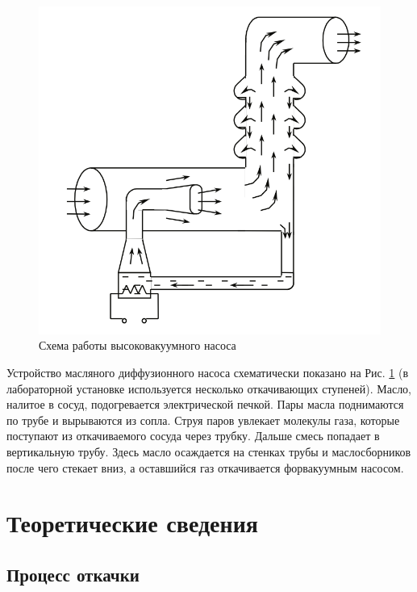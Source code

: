 \documentclass[a4paper,12pt]{article}
\theoremstyle{definition}
\begin{document}
	\begin{figure}
		\centering
		\includegraphics[width=1\linewidth]{pump}
		\caption{Схема работы высоковакуумного насоса}\label{pump}
	\end{figure}

	Устройство масляного диффузионного насоса схематически показано на Рис. \ref{pump} (в лабораторной установке используется несколько откачивающих ступеней). Масло, налитое в сосуд, подогревается электрической печкой. Пары масла поднимаются по трубе и вырываются из сопла. Струя паров увлекает молекулы газа, которые поступают из откачиваемого сосуда через трубку. Дальше смесь попадает в вертикальную трубу. Здесь масло осаждается на стенках трубы и маслосборников после чего стекает вниз, а оставшийся газ откачивается форвакуумным насосом. 
	
	\section{Теоретические сведения}
	\subsection{Процесс откачки}
	
\end{document}
